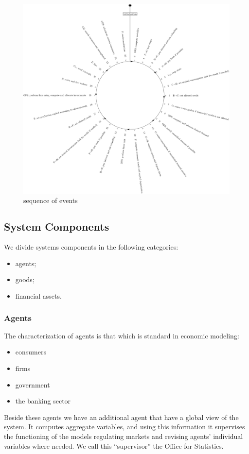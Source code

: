 \documentclass{article}
\begin{document}
\begin{figure}[htp]
	\centering
\includegraphics[scale=0.5]{visual.pdf}
	\caption{sequence of events}
	\label{fig:sequence}
\end{figure}

\newpage
\subsection{System Components}
We divide systems components in the following categories:
\begin{itemize}
	\item agents;
	\item goods;
	\item financial assets.
\end{itemize}
\subsubsection{Agents}
The characterization of agents is that which is standard in economic modeling:
\begin{itemize}
	\item consumers
	\item firms
	\item government
	\item the banking sector
\end{itemize}
Beside these agents we have an additional agent that have a global view of the system. It computes aggregate variables, and using this information it supervises the functioning of the models regulating markets and revising agents' individual variables where needed. We call this ``supervisor'' the Office for Statistics.
\end{document}
